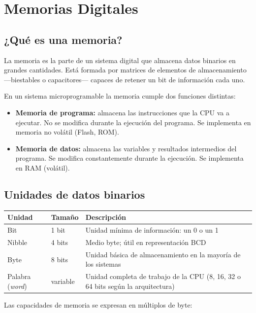 \chapter{Memorias Digitales}

\section{¿Qué es una memoria?}

La memoria es la parte de un sistema digital que almacena datos binarios en grandes cantidades. Está formada por matrices de elementos de almacenamiento ---biestables o capacitores--- capaces de retener un bit de información cada uno.

En un sistema microprogramable la memoria cumple dos funciones distintas:

\begin{itemize}
  \item \textbf{Memoria de programa:} almacena las instrucciones que la CPU va a ejecutar. No se modifica durante la ejecución del programa. Se implementa en memoria no volátil (Flash, ROM).
  \item \textbf{Memoria de datos:} almacena las variables y resultados intermedios del programa. Se modifica constantemente durante la ejecución. Se implementa en RAM (volátil).
\end{itemize}

\section{Unidades de datos binarios}

\begin{table}[H]
\centering
\begin{tabular}{llp{7cm}}
\toprule
Unidad & Tamaño & Descripción \\
\midrule
Bit & 1 bit & Unidad mínima de información: un 0 o un 1 \\
Nibble & 4 bits & Medio byte; útil en representación BCD \\
Byte & 8 bits & Unidad básica de almacenamiento en la mayoría de los sistemas \\
Palabra (\textit{word}) & variable & Unidad completa de trabajo de la CPU (8, 16, 32 o 64 bits según la arquitectura) \\
\bottomrule
\end{tabular}
\end{table}

Las capacidades de memoria se expresan en múltiplos de byte:

